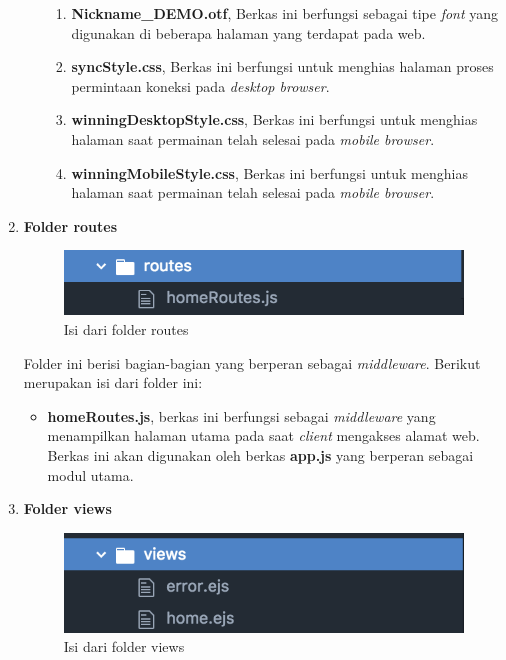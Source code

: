 \begin{enumerate}
\begin{enumerate}
\begin{enumerate}
			\item \textbf{Nickname\_DEMO.otf}, Berkas ini berfungsi sebagai tipe \textit{font} yang digunakan di beberapa halaman yang terdapat pada web.
			
			\item \textbf{syncStyle.css}, Berkas ini berfungsi untuk menghias halaman proses permintaan koneksi pada \textit{desktop browser}.
			
			\item \textbf{winningDesktopStyle.css}, Berkas ini berfungsi untuk menghias halaman saat permainan telah selesai pada \textit{mobile browser}.
			
			\item \textbf{winningMobileStyle.css}, Berkas ini berfungsi untuk menghias halaman saat permainan telah selesai pada \textit{mobile browser}.
			
			
		\end{enumerate}
	\end{enumerate}
	
	\item \textbf{Folder routes} \\
	
	\begin{figure}[H]
		\centering
		\includegraphics[scale=0.4]{Gambar/direktori_routes}
		\caption{Isi dari folder routes}
		\label{fig:direktori_routes}
	\end{figure}
	
	Folder ini berisi bagian-bagian yang berperan sebagai \textit{middleware}. Berikut merupakan isi dari folder ini:
	\begin{itemize}
		\item \textbf{homeRoutes.js}, berkas ini berfungsi sebagai \textit{middleware} yang menampilkan halaman utama pada saat \textit{client} mengakses alamat web. Berkas ini akan digunakan oleh berkas \textbf{app.js} yang berperan sebagai modul utama.
	\end{itemize}

	\item \textbf{Folder views} \\
	
	\begin{figure}[H]
		\centering
		\includegraphics[scale=0.4]{Gambar/direktori_views}
		\caption{Isi dari folder views}
		\label{fig:direktori_views}
	\end{figure}
	

\end{enumerate}
